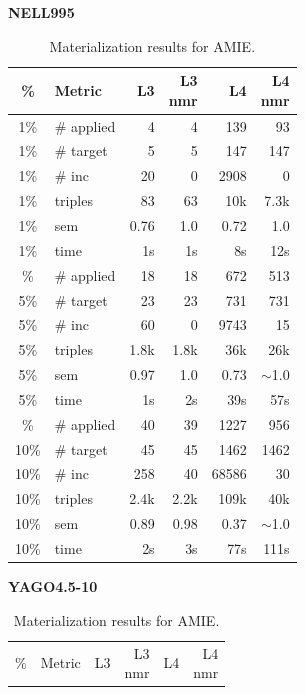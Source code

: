 \documentclass[a4paper,UKenglish,cleveref, autoref, thm-restate]{tgdk-v2021}
\begin{document}
\begin{table}[ht]
\centering
\scriptsize
\setlength{\tabcolsep}{4pt}
\renewcommand{\arraystretch}{1.15}
\caption{Materialization results for AMIE.}
\label{tab:mat_amie_10_30}

\begin{minipage}[t]{0.49\linewidth}
\centering
\textbf{NELL995}\\
\begin{tabular}{c l | r r r r}
\toprule
\% & Metric & L3 & \shortstack{L3\\nmr} & L4 & \shortstack{L4\\nmr} \\
\midrule
1\% & \# applied & 4 & 4 & 139 & 93 \\
1\% & \# target & 5 & 5 & 147 & 147 \\
1\% & \# inc & 20 & 0 & 2908 & 0 \\
1\% & triples & 83 & 63 & 10k & 7.3k \\
1\% & sem & 0.76 & 1.0 & 0.72 & 1.0 \\
1\% & time & 1s & 1s & 8s & 12s \\
\addlinespace
5\% & \# applied & 18 & 18 & 672 & 513 \\
5\% & \# target & 23 & 23 & 731 & 731 \\
5\% & \# inc & 60 & 0 & 9743 & 15 \\
5\% & triples & 1.8k & 1.8k & 36k & 26k \\
5\% & sem & 0.97 & 1.0 & 0.73 & $\sim$1.0 \\
5\% & time & 1s & 2s & 39s & 57s \\
\addlinespace
10\% & \# applied & 40 & 39 & 1227 & 956 \\
10\% & \# target & 45 & 45 & 1462 & 1462 \\
10\% & \# inc & 258 & 40 & 68586 & 30 \\
10\% & triples & 2.4k & 2.2k & 109k & 40k \\
10\% & sem & 0.89 & 0.98 & 0.37 & $\sim$1.0 \\
10\% & time & 2s & 3s & 77s & 111s \\
\bottomrule
\end{tabular}
\end{minipage}%
\hfill
\begin{minipage}[t]{0.49\linewidth}
\centering
\textbf{YAGO4.5-10}\\
\begin{tabular}{c l | r r r r}
\toprule
\% & Metric & L3 & \shortstack{L3\\nmr} & L4 & \shortstack{L4\\nmr} \\

\end{tabular}
\end{minipage}
\end{table}
\end{document}
